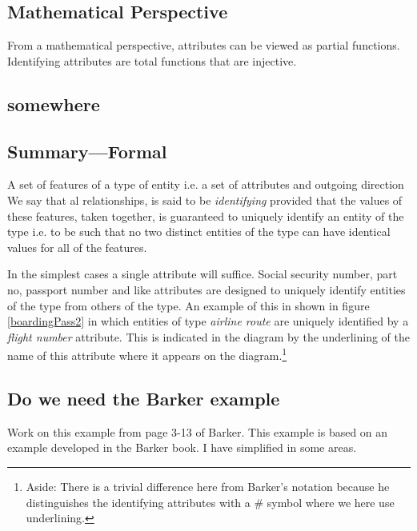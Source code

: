\subsection {Mathematical Perspective}
\mynote From a mathematical perspective, attributes can be viewed as partial functions. Identifying attributes are total functions that are injective.  



\subsection{somewhere}


\subsection{Summary---Formal}
\mynote A set of features of a type of entity i.e. a set of attributes and outgoing direction We say that al relationships, is said to be \textit{identifying} provided that the values of these features,
taken together, is guaranteed to uniquely identify an entity of the type i.e. to be such that no two distinct entities of the type can have identical values for all of the features. 

\mynote In the simplest cases a single attribute will suffice. Social security number, part no, 
passport number and like attributes are designed to uniquely identify entities of the type from others of the type. 
An example of this 
in  shown in figure \ref{boardingPass2} in which entities of type \textit{airline route} are uniquely identified by a \textit{flight number} attribute.
This is
indicated in the diagram  by the underlining of the name of this attribute where it appears on the diagram.\footnote{Aside: There is a trivial difference here from Barker's notation because he distinguishes the identifying attributes with a \# symbol where we here use  underlining.} 

 
\subsection{Do we need the Barker example}
\mynote Work on this example from page 3-13 of Barker.
{This example is based on an example developed in the Barker book. I have simplified in some areas.}



